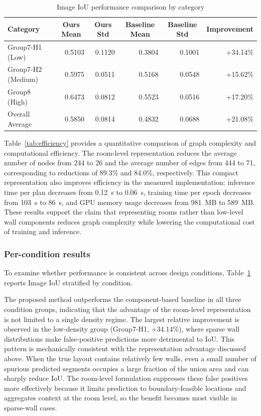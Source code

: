 \begin{table}[t]
\centering
\caption{Image IoU performance comparison by category}
\label{tab:per_condition}
\begin{tabular*}{\textwidth}{@{\extracolsep{\fill}} lrrrrr @{}}
\toprule
Category & \multicolumn{1}{c}{Ours Mean} & \multicolumn{1}{c}{Ours Std} & \multicolumn{1}{c}{Baseline Mean} & \multicolumn{1}{c}{Baseline Std} & \multicolumn{1}{r}{Improvement} \\
\midrule
Group7-H1 (Low)      & 0.5103 & 0.1120 & 0.3804 & 0.1001 & +34.14\% \\
Group7-H2 (Medium)   & 0.5975 & 0.0511 & 0.5168 & 0.0548 & +15.62\% \\
Group8 (High)   & 0.6473 & 0.0812 & 0.5523 & 0.0516 & +17.20\% \\
\midrule
Overall Average & 0.5850 & 0.0814 & 0.4832 & 0.0688 & +21.08\% \\
\bottomrule
\end{tabular*}
\end{table}


Table~\ref{tab:efficiency} provides a quantitative comparison of graph complexity and computational efficiency. The room-level representation reduces the average number of nodes from 244 to 26 and the average number of edges from 444 to 71, corresponding to reductions of 89.3\% and 84.0\%, respectively. This compact representation also improves efficiency in the measured implementation: inference time per plan decreases from 0.12~s to 0.06~s, training time per epoch decreases from 103~s to 86~s, and GPU memory usage decreases from 981~MB to 589~MB. These results support the claim that representing rooms rather than low-level wall components reduces graph complexity while lowering the computational cost of training and inference.

\subsubsection{Per-condition results}

To examine whether performance is consistent across design conditions, Table~\ref{tab:per_condition} reports Image IoU stratified by condition.

The proposed method outperforms the component-based baseline in all three condition groups, indicating that the advantage of the room-level representation is not limited to a single density regime. The largest relative improvement is observed in the low-density group (Group7-H1, +34.14\%), where sparse wall distributions make false-positive predictions more detrimental to IoU. This pattern is mechanically consistent with the representation advantage discussed above. When the true layout contains relatively few walls, even a small number of spurious predicted segments occupies a large fraction of the union area and can sharply reduce IoU. The room-level formulation suppresses these false positives more effectively because it limits prediction to boundary-feasible locations and aggregates context at the room level, so the benefit becomes most visible in sparse-wall cases.

